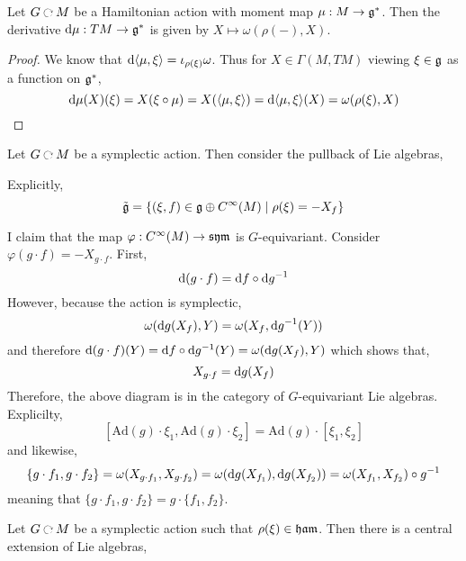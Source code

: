 \documentclass[12pt]{extarticle}
\newcommand{\R}{\mathbb{R}}
\newcommand{\Ad}{\mathrm{Ad}}
\begin{document}
\begin{lemma}
Let $G \acts M$ be a Hamiltonian action with moment map $\mu : M \to \mathfrak{g}^*$. Then the derivative $\mathrm{d}{\mu} : TM \to \mathfrak{g}^*$ is given by $X \mapsto \omega(\rho(-), X)$.
\end{lemma}

\begin{proof}
We know that $\mathrm{d}{\left< \mu , \xi \right>} = \iota_{\rho(\xi)} \omega$. Thus for $X \in \Gamma(M, TM)$ viewing $\xi \in \mathfrak{g}$ as a function on $\mathfrak{g}^*$,
\[ \mathrm{d}{\mu}(X)(\xi) = X(\xi \circ \mu) = X(\left< \mu , \xi \right>) = \mathrm{d}{\left< \mu , \xi \right>}(X) = \omega(\rho(\xi), X) \]
\end{proof}


\begin{defn}
Let $G \acts M$ be a symplectic action. Then consider the pullback of Lie algebras,
\begin{center}
\end{center}
Explicitly,
\[ \tilde{\mathfrak{g}} = \{(\xi, f) \in \mathfrak{g} \oplus C^{\infty}(M) \mid \rho(\xi) = - X_f \} \]
\end{defn}

\begin{rmk}
I claim that the map $\varphi : C^\infty(M) \to \mathfrak{sym}$ is $G$-equivariant. Consider $\varphi(g \cdot f) = - X_{g \cdot f}$. First,
\[ \mathrm{d}{(g \cdot f)} = \mathrm{d}{f} \circ \mathrm{d}{g^{-1}} \]
However, because the action is symplectic,
\[ \omega(\mathrm{d}{g}(X_f), Y) = \omega(X_f, \mathrm{d}{g^{-1}}(Y)) \]
and therefore $\mathrm{d}{(g \cdot f)}(Y) = \mathrm{d}{f} \circ \mathrm{d}{g^{-1}}(Y) = \omega(\mathrm{d}{g}(X_f), Y)$ which shows that,
\[ X_{g \cdot f} = \mathrm{d}{g}(X_f) \]
Therefore, the above diagram is in the category of $G$-equivariant Lie algebras. Explicilty,
\[ [\Ad(g) \cdot \xi_1, \Ad(g) \cdot \xi_2] = \Ad(g) \cdot [\xi_1, \xi_2] \]
and likewise,
\[ \{ g \cdot f_1, g \cdot f_2 \} = \omega(X_{g \cdot f_1}, X_{g \cdot f_2}) = \omega(\mathrm{d}{g}(X_{f_1}), \mathrm{d}{g}(X_{f_2})) = \omega(X_{f_1}, X_{f_2}) \circ g^{-1} \]
meaning that $\{ g \cdot f_1, g \cdot f_2 \} = g \cdot \{ f_1, f_2 \}$.
\end{rmk}

\begin{prop}
Let $G \acts M$ be a symplectic action such that $\rho(\xi) \in \mathfrak{ham}$. Then there is a central extension of Lie algebras,
\begin{center}
\end{center}
\end{prop}
\end{document}
